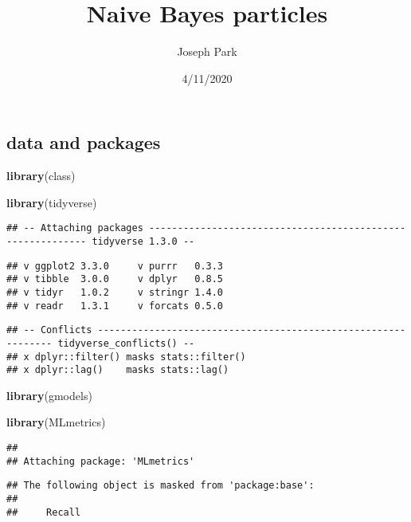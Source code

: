 \documentclass[
]{article}
\title{Naive Bayes particles}
\author{Joseph Park}
\date{4/11/2020}
\newenvironment{Shaded}{\begin{snugshade}}{\end{snugshade}}
\newcommand{\KeywordTok}[1]{\textcolor[rgb]{0.13,0.29,0.53}{\textbf{#1}}}
\newcommand{\NormalTok}[1]{#1}
\begin{document}
\maketitle

\hypertarget{data-and-packages}{%
\subsection{data and packages}\label{data-and-packages}}

\begin{Shaded}
\begin{Highlighting}[]
\KeywordTok{library}\NormalTok{(class)}

\KeywordTok{library}\NormalTok{(tidyverse)}
\end{Highlighting}
\end{Shaded}

\begin{verbatim}
## -- Attaching packages ----------------------------------------------------------- tidyverse 1.3.0 --
\end{verbatim}

\begin{verbatim}
## v ggplot2 3.3.0     v purrr   0.3.3
## v tibble  3.0.0     v dplyr   0.8.5
## v tidyr   1.0.2     v stringr 1.4.0
## v readr   1.3.1     v forcats 0.5.0
\end{verbatim}

\begin{verbatim}
## -- Conflicts -------------------------------------------------------------- tidyverse_conflicts() --
## x dplyr::filter() masks stats::filter()
## x dplyr::lag()    masks stats::lag()
\end{verbatim}

\begin{Shaded}
\begin{Highlighting}[]
\KeywordTok{library}\NormalTok{(gmodels)}

\KeywordTok{library}\NormalTok{(MLmetrics)}
\end{Highlighting}
\end{Shaded}

\begin{verbatim}
## 
## Attaching package: 'MLmetrics'
\end{verbatim}

\begin{verbatim}
## The following object is masked from 'package:base':
## 
##     Recall
\end{verbatim}
\end{document}
